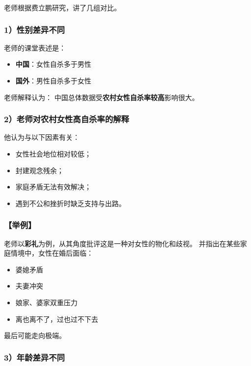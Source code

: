 \documentclass[
  chinese,
  9pt,
  a4paper,
]{ctexart}
\providecommand{\tightlist}{%
  \setlength{\itemsep}{0pt}\setlength{\parskip}{0pt}}
\begin{document}
老师根据费立鹏研究，讲了几组对比。

\subsubsection{1）性别差异不同}\label{ux6027ux522bux5deeux5f02ux4e0dux540c}

老师的课堂表述是：

\begin{itemize}
\tightlist
\item
  \textbf{中国}：女性自杀多于男性
\item
  \textbf{国外}：男性自杀多于女性
\end{itemize}

老师解释认为： 中国总体数据受\textbf{农村女性自杀率较高}影响很大。

\subsubsection{2）老师对农村女性高自杀率的解释}\label{ux8001ux5e08ux5bf9ux519cux6751ux5973ux6027ux9ad8ux81eaux6740ux7387ux7684ux89e3ux91ca}

他认为与以下因素有关：

\begin{itemize}
\tightlist
\item
  女性社会地位相对较低；
\item
  封建观念残余；
\item
  家庭矛盾无法有效解决；
\item
  遇到不公和挫折时缺乏支持与出路。
\end{itemize}

\subsubsection{【举例】}\label{ux4e3eux4f8b-1}

老师以\textbf{彩礼}为例，从其角度批评这是一种对女性的物化和歧视。
并指出在某些家庭情境中，女性在婚后面临：

\begin{itemize}
\tightlist
\item
  婆媳矛盾
\item
  夫妻冲突
\item
  娘家、婆家双重压力
\item
  离也离不了，过也过不下去
\end{itemize}

最后可能走向极端。

\subsubsection{3）年龄差异不同}\label{ux5e74ux9f84ux5deeux5f02ux4e0dux540c}
\end{document}
